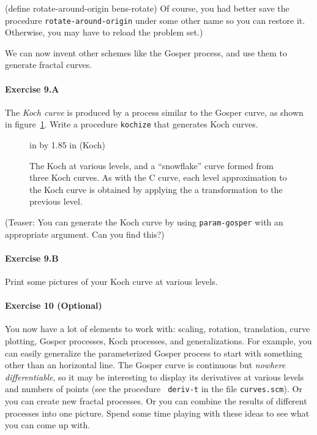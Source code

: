 \beginlisp
(define rotate-around-origin bens-rotate)
\endlisp
Of course, you had better save the procedure {\tt rotate-around-origin}
under some other name so you can restore it.  Otherwise, you may have to
reload the problem set.)

\medskip

We can now invent other schemes like the Gosper process, and use them
to generate fractal curves.

\paragraph{Exercise 9.A}  The {\em Koch curve} is produced by a
process similar to the Gosper curve, as shown in figure~\ref{Koch}.
Write a procedure {\tt kochize} that generates Koch curves.

\begin{figure}
 in by 1.85 in (Koch)
\caption{{\protect\footnotesize
The Koch at various levels, and a ``snowflake'' curve formed from
three Koch curves.  As with the C curve, each level approximation
to the Koch curve is obtained by
applying the a transformation to the previous level.}}
\label{Koch}
\end{figure}

(Teaser: You can generate the Koch curve by using {\tt param-gosper} with
an appropriate argument.  Can you find this?)


\paragraph{Exercise 9.B} Print some pictures of your Koch curve at
various levels.

\paragraph{Exercise 10 (Optional)}

You now have a lot of elements to work with: scaling, rotation,
translation, curve plotting, Gosper processes, Koch processes, and
generalizations.  For example, you can easily generalize the
parameterized Gosper process to start with something other than an
horizontal line.  The Gosper curve is continuous but {\em nowhere
differentiable}, so it may be interesting to display its derivatives
at various levels and numbers of points (see the procedure {\tt
deriv-t} in the file {\tt curves.scm}).  Or you can create new fractal
processes.  Or you can combine the results of different processes into
one picture.  Spend some time playing with these ideas to see what you
can come up with.



